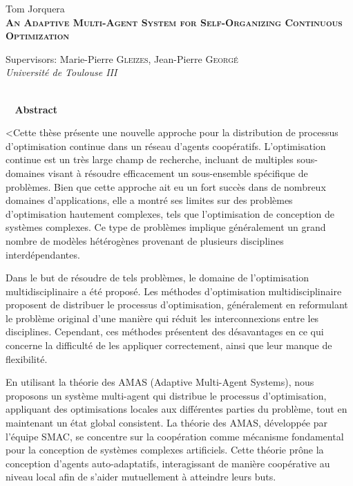 \if@doubleinterligne\renewcommand{}\fi
  \thispagestyle{plain}
  \begin{center}
    \Large Tom Jorquera\\
    \addvspace{2mm}
    \textsc{\textbf{An Adaptive Multi-Agent System for Self-Organizing Continuous Optimization}}\\
	\addvspace{2mm}
    \begin{center}
   	 \large\normalfont Supervisors: Marie-Pierre \textsc{Gleizes}, Jean-Pierre \textsc{Georgé}\\
   	  \large\normalfont \emph{Université de Toulouse III}\\
     \end{center}
     \\
    \addvspace{3mm}
    \textbf{\hrulefill~ Abstract ~\hrulefill}\\  
     
  \end{center}
  \vspace{-0.3cm}
        
<\normalsize \hspace{0.6cm}Cette thèse présente une nouvelle approche pour la distribution de processus d’optimisation continue dans un réseau d'agents coopératifs. L’optimisation continue est un très large champ de recherche, incluant de multiples sous-domaines visant à résoudre efficacement un sous-ensemble spécifique de problèmes. Bien que cette approche ait eu un fort succès dans de nombreux domaines d'applications, elle a montré ses limites sur des problèmes d'optimisation hautement complexes, tels que l’optimisation de conception de systèmes complexes. Ce type de problèmes implique généralement un grand nombre de modèles hétérogènes provenant de plusieurs disciplines interdépendantes.

Dans le but de résoudre de tels problèmes, le domaine de l’optimisation multidisciplinaire a été proposé. Les méthodes d'optimisation multidisciplinaire proposent de distribuer le processus d'optimisation, généralement en reformulant le problème original d'une manière qui réduit les interconnexions entre les disciplines. Cependant, ces méthodes présentent des désavantages en ce qui concerne la difficulté de les appliquer correctement, ainsi que leur manque de flexibilité.

En utilisant la théorie des AMAS (Adaptive Multi-Agent Systems), nous proposons un système multi-agent qui distribue le processus d'optimisation, appliquant des optimisations locales aux différentes parties du problème, tout en maintenant un état global consistent. La théorie des AMAS, développée par l'équipe SMAC, se concentre sur la coopération comme mécanisme fondamental pour la conception de systèmes complexes artificiels. Cette théorie prône la conception d'agents auto-adaptatifs, interagissant de manière coopérative au niveau local afin de s'aider mutuellement à atteindre leurs buts.

